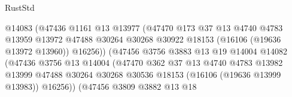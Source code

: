 \begin{lexlean}{RustStd}
\begin{coremodule}
                                        @14083
                                        (@47436
                                          @1161
                                          @13
                                          @13977
                                          (@47470
                                            @173
                                            @37
                                            @13
                                            @4740
                                            @4783
                                            @13959
                                            @13972
                                            @47488
                                            @30264
                                            @30268
                                            @30922
                                            @18153
                                            (@16106 (@19636 @13972 @13960))
                                            @16256))
                                        (@47456
                                          @3756
                                          @3883
                                          @13
                                          @19
                                          @14004
                                          @14082
                                          (@47436
                                            @3756
                                            @13
                                            @14004
                                            (@47470
                                              @362
                                              @37
                                              @13
                                              @4740
                                              @4783
                                              @13982
                                              @13999
                                              @47488
                                              @30264
                                              @30268
                                              @30536
                                              @18153
                                              (@16106 (@19636 @13999 @13983))
                                              @16256))
                                          (@47456
                                            @3809
                                            @3882
                                            @13
                                            @18

\end{coremodule}
\end{lexlean}
